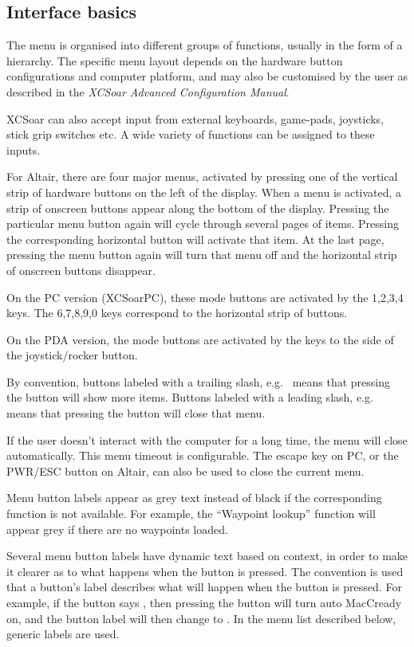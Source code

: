 \documentclass[a4paper,12pt]{refrep}
\begin{document}
\subsection*{Interface basics}

The menu is organised into different groups of functions, usually in
the form of a hierarchy.  The specific menu layout depends on the
hardware button configurations and computer platform, and may also be
customised by the user as described in the {\em XCSoar Advanced
Configuration Manual}.

XCSoar can also accept input from external keyboards, game-pads,
joysticks, stick grip switches etc.  A wide variety of functions can
be assigned to these inputs.

For Altair, there are four major menus, activated by pressing one of
the vertical strip of hardware buttons on the left of the display.
When a menu is activated, a strip of onscreen buttons appear along the
bottom of the display.  Pressing the particular menu button again will
cycle through several pages of items.  Pressing the corresponding
horizontal button will activate that item.  At the last page, pressing
the menu button again will turn that menu off and the horizontal strip
of onscreen buttons disappear.  

On the PC version (XCSoarPC), these mode buttons are activated by the
1,2,3,4 keys.  The 6,7,8,9,0 keys correspond to the horizontal strip
of buttons.

On the PDA version, the mode buttons are activated by the keys to the
side of the joystick/rocker button.

By convention, buttons labeled with a trailing slash,
e.g.~ means that pressing the button will show more items.
Buttons labeled with a leading slash, e.g.~ means that
pressing the button will close that menu.

If the user doesn't interact with the computer for a long time, the
menu will close automatically.  This menu timeout is configurable.
The escape key on PC, or the PWR/ESC button on Altair, can
also be used to close the current menu.

Menu button labels appear as grey text instead of black if the
corresponding function is not available.  For example, the ``Waypoint
lookup'' function will appear grey if there are no waypoints loaded.

Several menu button labels have dynamic text based on context, in
order to make it clearer as to what happens when the button is
pressed.  The convention is used that a button's label describes what
will happen when the button is pressed.  For example, if the button
says , then pressing the button will turn auto
MacCready on, and the button label will then change to .  In the menu list described below, generic labels are used.
\end{document}
